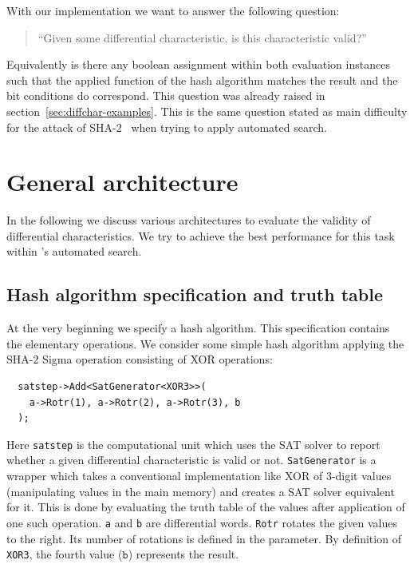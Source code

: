 With our implementation we want to answer the following question:
\begin{quote}
  ``Given some differential characteristic, is this characteristic valid?''
\end{quote}
Equivalently is there any boolean assignment within both evaluation instances such that the applied function of the hash algorithm matches the result and the bit conditions do correspond. This question was already raised in section~\ref{sec:diffchar-examples}. This is the same question stated as main difficulty for the attack of SHA-2~\cite[293]{Cry07} when trying to apply automated search.

\section{General architecture}
\label{sec:architecture}
%
In the following we discuss various architectures to evaluate the validity of differential characteristics. We try to achieve the best performance for this task within \nltool{}'s automated search.

\subsection{Hash algorithm specification and truth table}
%
At the very beginning we specify a hash algorithm. This specification contains the elementary operations. We consider some simple hash algorithm applying the SHA-2 Sigma operation consisting of XOR operations:
\begin{lstlisting}
  satstep->Add<SatGenerator<XOR3>>(
    a->Rotr(1), a->Rotr(2), a->Rotr(3), b
  );
\end{lstlisting}

Here \texttt{satstep} is the computational unit which uses the SAT solver to report whether a given differential characteristic is valid or not. \texttt{SatGenerator} is a wrapper which takes a conventional implementation like XOR of 3-digit values (manipulating values in the main memory) and creates a SAT solver equivalent for it. This is done by evaluating the truth table of the values after application of one such operation. \texttt{a} and \texttt{b} are differential words. \texttt{Rotr} rotates the given values to the right. Its number of rotations is defined in the parameter. By definition of \texttt{XOR3}, the fourth value ($\texttt{b}$) represents the result.

